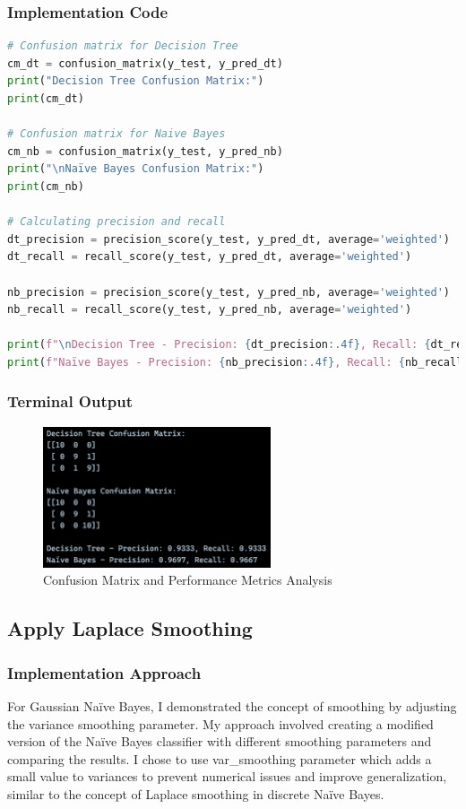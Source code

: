 \documentclass[12pt,a4paper]{article}
\begin{document}
\subsubsection{Implementation Code}
\begin{lstlisting}[language=Python, caption=Analyze Confusion Matrix Precision Recall]
# Confusion matrix for Decision Tree
cm_dt = confusion_matrix(y_test, y_pred_dt)
print("Decision Tree Confusion Matrix:")
print(cm_dt)

# Confusion matrix for Naive Bayes
cm_nb = confusion_matrix(y_test, y_pred_nb)
print("\nNaïve Bayes Confusion Matrix:")
print(cm_nb)

# Calculating precision and recall
dt_precision = precision_score(y_test, y_pred_dt, average='weighted')
dt_recall = recall_score(y_test, y_pred_dt, average='weighted')

nb_precision = precision_score(y_test, y_pred_nb, average='weighted')
nb_recall = recall_score(y_test, y_pred_nb, average='weighted')

print(f"\nDecision Tree - Precision: {dt_precision:.4f}, Recall: {dt_recall:.4f}")
print(f"Naïve Bayes - Precision: {nb_precision:.4f}, Recall: {nb_recall:.4f}")
\end{lstlisting}

\subsubsection{Terminal Output}

\begin{figure}[h!]
    \centering
    \includegraphics[width=0.6\textwidth]{Figures/cfmatrix.png}
    \caption{Confusion Matrix and Performance Metrics Analysis}
\end{figure}

\newpage
\subsection{Apply Laplace Smoothing}

\subsubsection{Implementation Approach}
For Gaussian Na\"{i}ve Bayes, I demonstrated the concept of smoothing by adjusting the variance smoothing parameter. My approach involved creating a modified version of the Na\"{i}ve Bayes classifier with different smoothing parameters and comparing the results. I chose to use var\_smoothing parameter which adds a small value to variances to prevent numerical issues and improve generalization, similar to the concept of Laplace smoothing in discrete Na\"{i}ve Bayes.
\end{document}
